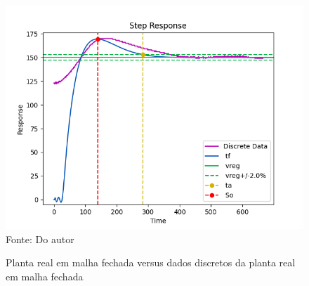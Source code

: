 \begin{figure}[H]
    \centering
    \caption{Planta real em malha fechada versus dados discretos da planta real em malha fechada}
    \includegraphics[scale=0.8]{figuras/real_planta_ctrl_vs_disc}
    \label{fig:real_planta_ctrl_vs_disc}
    \\
    \vspace{0cm}\hspace{0cm}\small{Fonte: Do autor}
\end{figure}
